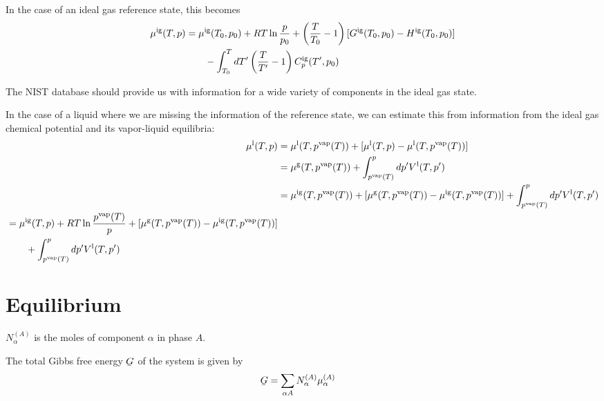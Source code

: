 \documentclass[12pt]{article}
\begin{document}
In the case of an ideal gas reference state, this becomes
\begin{equation}
\begin{split}
\mu^{\rm ig}(T,p) &= \mu^{\rm ig}(T_0,p_0) 
+ RT \ln \frac{p}{p_0}
+ \left(\frac{T}{T_0}-1\right) [G^{\rm ig}(T_0,p_0)-H^{\rm ig}(T_0,p_0)]
\\ & \qquad
- \int_{T_0}^{T} dT' \left(\frac{T}{T'}-1\right) C_p^{\rm ig}(T',p_0)
\end{split}
\end{equation}


The NIST database should provide us with information for a wide
variety of components in the ideal gas state.


In the case of a liquid where we are missing the information of the
reference state, we can estimate this from information from the ideal
gas chemical potential and its vapor-liquid equilibria:
\begin{align}
\mu^{\rm l}(T,p) &= \mu^{\rm l}(T,p^{\rm vap}(T)) 
+ [\mu^{\rm l}(T,p) - \mu^{\rm l}(T,p^{\rm vap}(T))]
\nonumber
\\
&= \mu^{\rm g}(T,p^{\rm vap}(T)) 
+ \int_{p^{\rm vap}(T)}^p dp' V^{\rm l}(T,p')
\nonumber
\\
&= \mu^{\rm ig}(T,p^{\rm vap}(T)) 
+ [\mu^{\rm g}(T,p^{\rm vap}(T))-\mu^{\rm ig}(T,p^{\rm vap}(T))] 
+ \int_{p^{\rm vap}(T)}^p dp' V^{\rm l}(T,p')
\nonumber
\\
\begin{split}
&= \mu^{\rm ig}(T,p) + RT\ln\frac{p^{\rm vap}(T) }{p}
+ [\mu^{\rm g}(T,p^{\rm vap}(T))-\mu^{\rm ig}(T,p^{\rm vap}(T))] 
\\ & \qquad
+ \int_{p^{\rm vap}(T)}^p dp' V^{\rm l}(T,p')
\end{split}
\end{align}


\section{Equilibrium}


$N_\alpha^{(A)}$ is the moles of component $\alpha$ in phase $A$.

The total Gibbs free energy $\underaccent{\bar}{G}$ of the system
is given by
\begin{align*}
\underaccent{\bar}{G} &= \sum_{\alpha A} N_\alpha^{(A)} \mu_\alpha^{(A)} 
\end{align*}
\end{document}
